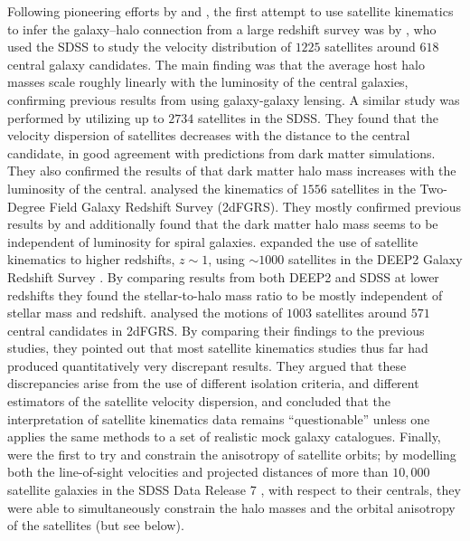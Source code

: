 \documentclass[fleqn,usenatbib,useAMS]{mnras}
\begin{document}
	Following pioneering efforts by \cite{Erickson+87} and \cite{Zaritsky+93, Zaritsky+97}, the first attempt to use satellite kinematics to infer the galaxy--halo connection from a large redshift survey was by \cite{McKay+02}, who used the SDSS to study the velocity distribution of $1225$ satellites around $618$ central galaxy candidates. The main finding was that the average host halo masses scale roughly linearly with the luminosity of the central galaxies, confirming previous results from \cite{McKay+01} using galaxy-galaxy lensing. A similar study was performed by \cite{Prada+03} utilizing up to $2734$ satellites in the SDSS. They found that the velocity dispersion of satellites decreases with the distance to the central candidate, in good agreement with predictions from dark matter simulations. They also confirmed the results of \cite{McKay+02} that dark matter halo mass increases with the luminosity of the central. \cite{Brainerd+03} analysed the kinematics of $1556$ satellites in the Two-Degree Field Galaxy Redshift Survey (2dFGRS). They mostly confirmed previous results by \cite{McKay+02} and additionally found that the dark matter halo mass seems to be independent of luminosity for spiral galaxies. \cite{Conroy+07} expanded the use of satellite kinematics to higher redshifts, $z \sim 1$, using $\sim 1000$ satellites in the DEEP2 Galaxy Redshift Survey \citep[][]{Davis+03}. By comparing results from both DEEP2 and SDSS at lower redshifts they found the stellar-to-halo mass ratio to be mostly independent of stellar mass and redshift. \cite{Norberg+08} analysed the motions of $1003$ satellites around $571$ central candidates in 2dFGRS. By comparing their findings to the previous studies, they pointed out that most satellite kinematics studies thus far had produced quantitatively very discrepant results. They argued that these discrepancies arise from the use of different isolation criteria, and different estimators of the satellite velocity dispersion, and concluded that the interpretation of satellite kinematics data remains ``questionable'' unless one applies the same methods to a set of realistic mock galaxy catalogues. Finally, \cite{Wojtak+13} were the first to try and constrain the anisotropy of satellite orbits; by modelling both the line-of-sight velocities and projected distances of more than $10,000$ satellite galaxies in the SDSS Data Release 7 \citep[DR7][]{Abazajian+09}, with respect to their centrals, they were able to simultaneously constrain the halo masses and the orbital anisotropy of the satellites (but see below).
	
\end{document}
